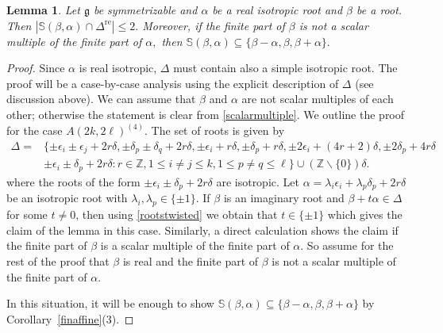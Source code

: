 \documentclass[11pt,reqno]{amsart}
\theoremstyle{plain}
\newtheorem*{lemma}{Lemma}
\theoremstyle{definition}
\theoremstyle{remark}
\newcommand{\lie}[1]{\mathfrak{#1}}
\newcommand\bz{\mathbb Z}
\numberwithin{equation}{section}
\begin{document}
\begin{lemma}
Let $\lie g$ be symmetrizable and $\alpha$ be a real isotropic root and $\beta$ be a root. Then $|\mathbb{S}(\beta,\alpha)\cap\Delta^{\mathrm{re}}|\le 2.$ 
Moreover, if the finite part of $\beta$ is not a scalar multiple of the \textit{finite part} of $\alpha,$ then $\mathbb{S}(\beta,\alpha)\subseteq\{\beta-\alpha,\beta,\beta+\alpha\}.$
\end{lemma}
\begin{proof} Since $\alpha$ is real isotropic, $\Delta$ must contain also a simple isotropic root. The proof will be a case-by-case analysis using the explicit description of $\Delta$ (see discussion above). We can assume that $\beta$ and $\alpha$ are not scalar multiples of each other; otherwise the statement is clear from \eqref{scalarmultiple}. We outline the proof for the case $A(2k,2\ell)^{(4)}$. The set of roots is given by 
\begin{equation}\label{rootstwisted}
    \begin{aligned}
        \Delta=& \{\pm\epsilon_i\pm\epsilon_j+2r\delta, \pm\delta_p\pm\delta_q+2r\delta, \pm \epsilon_i+r \delta, \pm\delta_{p}+r\delta, \pm 2\epsilon_i+(4r+2)\delta, \pm 2\delta_{p}+4r \delta\\ 
     & \pm\epsilon_i\pm\delta_p+2r\delta:r\in \bz, 1\le i\neq j\le k, 1\le p\neq q\le \ell\}\cup(\bz\backslash \{0\})\delta.
    \end{aligned}
\end{equation}
where the roots of the form $\pm\epsilon_i\pm\delta_p+2r\delta$ are isotropic. Let $\alpha=\lambda_i\epsilon_i+\lambda_p\delta_p+2r\delta$ be an isotropic root with $\lambda_i,\lambda_p\in \{\pm 1\}.$ If $\beta$ is an imaginary root and $\beta+t\alpha\in \Delta$ for some $t\neq 0$, then using \eqref{rootstwisted}  we obtain that $t\in \{\pm 1\}$ which gives the claim of the lemma in this case. Similarly, a direct calculation shows the claim if the finite part of $\beta$ is a scalar multiple of the finite part of $\alpha$. So assume for the rest of the proof that $\beta$ is real and the finite part of $\beta$ is not a scalar multiple of the finite part of $\alpha$.

In this situation, it will be enough to show $\mathbb{S}(\beta,\alpha)\subseteq\{\beta-\alpha,\beta,\beta+\alpha\}$ by Corollary~\ref{finaffine}(3).


\end{proof}
\end{document}
